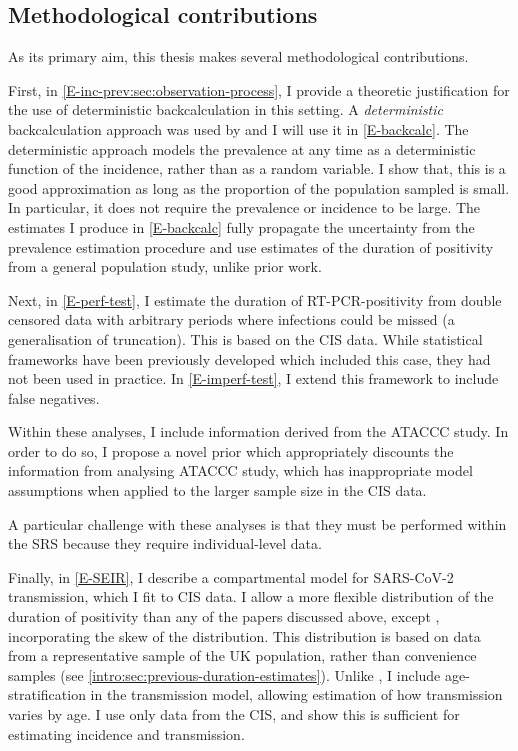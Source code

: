 \documentclass[thesis.tex]{subfiles}
\begin{document}
\subsection{Methodological contributions}

As its primary aim, this thesis makes several methodological contributions.

First, in \cref{E-inc-prev:sec:observation-process}, I provide a theoretic justification for the use of deterministic backcalculation in this setting.
A \emph{deterministic} backcalculation approach was used by \textcite{abbottCISincidence} and I will use it in \cref{E-backcalc}.
The deterministic approach models the prevalence at any time as a deterministic function of the incidence, rather than as a random variable.
I show that, this is a good approximation as long as the proportion of the population sampled is small.
In particular, it does not require the prevalence or incidence to be large.
The estimates I produce in \cref{E-backcalc} fully propagate the uncertainty from the prevalence estimation procedure and use estimates of the duration of positivity from a general population study, unlike prior work.

Next, in \cref{E-perf-test}, I estimate the duration of RT-PCR-positivity from double censored data with arbitrary periods where infections could be missed (a generalisation of truncation).
This is based on the CIS data.
While statistical frameworks have been previously developed which included this case, they had not been used in practice.
In \cref{E-imperf-test}, I extend this framework to include false negatives.

Within these analyses, I include information derived from the ATACCC study.
In order to do so, I propose a novel prior which appropriately discounts the information from analysing ATACCC study, which has inappropriate model assumptions when applied to the larger sample size in the CIS data.

A particular challenge with these analyses is that they must be performed within the SRS because they require individual-level data.


Finally, in \cref{E-SEIR}, I describe a compartmental model for SARS-CoV-2 transmission, which I fit to CIS data.
I allow a more flexible distribution of the duration of positivity than any of the papers discussed above, except \textcite{nicholsonImproving}, incorporating the skew of the distribution.
This distribution is based on data from a representative sample of the UK population, rather than convenience samples (see \cref{intro:sec:previous-duration-estimates}).
Unlike \textcite{nicholsonImproving}, I include age-stratification in the transmission model, allowing estimation of how transmission varies by age.
I use only data from the CIS, and show this is sufficient for estimating incidence and transmission.
\end{document}
